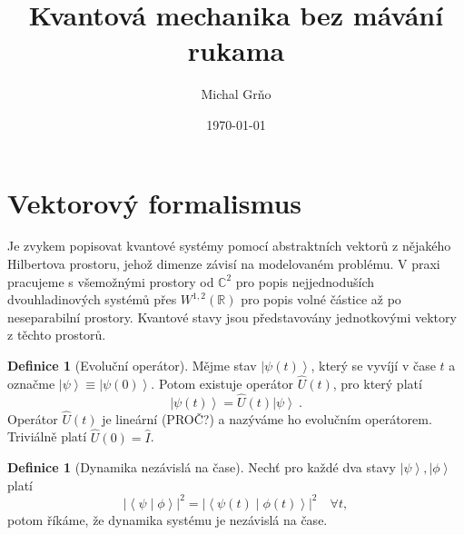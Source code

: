 \documentclass[10pt,a4paper]{article}
\theoremstyle{definition}
\newtheorem{definition}[theorem]{Definice}
\newcommand{\abs}[1]{\left| #1 \right|}
\newcommand{\ket}[1]{\left| #1 \right>}
\newcommand{\braket}[2]{\left< #1 \middle| #2 \right>}
\def\R{\mathbb{R}}
\def\C{\mathbb{C}}
\def\1{\hat{I}}
\begin{document}
\title{Kvantová mechanika bez mávání rukama}
\author{Michal Grňo}
\date{\today}

\maketitle

\section{Vektorový formalismus}
Je zvykem popisovat kvantové systémy pomocí abstraktních vektorů z nějakého Hilbertova prostoru, jehož dimenze závisí na modelovaném problému. V praxi pracujeme s všemožnými prostory od $\C^2$ pro popis nejjednoduších dvouhladinových systémů přes $W^{1,2}(\R)$ pro popis volné částice až po neseparabilní prostory. Kvantové stavy jsou představovány jednotkovými vektory z těchto prostorů.

\begin{definition}[Evoluční operátor]
    Mějme stav $\ket{\psi(t)}$, který se vyvíjí v čase $t$ a označme $\ket{\psi} \equiv \ket{\psi(0)}$. Potom existuje operátor $\hat{U}(t)$, pro který platí $$\ket{\psi(t)} = \hat{U}(t) \ket{\psi} \: .$$ Operátor $\hat{U}(t)$ je lineární (PROČ?) a nazýváme ho evolučním operátorem. Triviálně platí $\hat{U}(0) = \1$.
\end{definition}

\begin{definition}[Dynamika nezávislá na čase]
    Nechť pro každé dva stavy $\ket{\psi}, \ket{\phi}$ platí $$\abs{\braket{\psi}{\phi}}^2 = \abs{\braket{\psi(t)}{\phi(t)}}^2 \quad \forall t,$$ potom říkáme, že dynamika systému je nezávislá na čase.
\end{definition}
\end{document}
